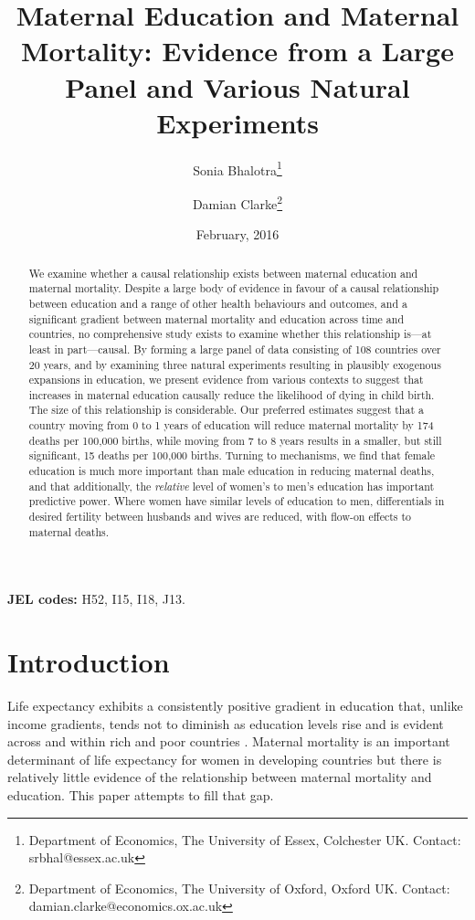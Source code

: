 \documentclass{article}[12pt,subeqn]
\title{Maternal Education and Maternal Mortality: 
Evidence from a Large Panel and Various Natural Experiments}
\author{Sonia Bhalotra\thanks{Department of Economics, The University of Essex,
    Colchester UK. Contact: srbhal@essex.ac.uk}
  \and{Damian Clarke\thanks{Department of Economics, The University of Oxford,
      Oxford UK. Contact: damian.clarke@economics.ox.ac.uk}}}
\date{February, 2016}
\begin{document}
\begin{spacing}{1.4}

\maketitle

\begin{abstract}
We examine whether a causal relationship exists between maternal education and 
maternal mortality. Despite a large body of evidence in favour of a causal 
relationship between education and a range of other health behaviours and 
outcomes, and a significant gradient between maternal mortality and education 
across time and countries, no comprehensive study exists to examine whether this 
relationship is---at least in part---causal.  By forming a large panel of data 
consisting of 108 countries over 20 years, and by examining three natural 
experiments resulting in plausibly exogenous expansions in education, we present 
evidence from various contexts to suggest that increases in maternal education
causally reduce the likelihood of dying in child birth.  The size of this
relationship is considerable.  Our preferred estimates suggest that a country
moving from 0 to 1 years of education will reduce maternal mortality by 174 deaths
per 100,000 births, while moving from 7 to 8 years results in a smaller, but still 
significant, 15 deaths per 100,000 births.  Turning to mechanisms, we find that
female education is much more important than male education in reducing maternal
deaths, and that additionally, the \emph{relative} level of women's to men's
education has important predictive power.  Where women have similar levels of
education to men, differentials in desired fertility between husbands and wives
are reduced, with flow-on effects to maternal deaths.
\end{abstract}
\hspace{8mm} \textbf{JEL codes:} H52, I15, I18, J13.

\newpage
\section{Introduction}
Life expectancy exhibits a consistently positive gradient in education that, 
unlike income gradients, tends not to diminish as education levels rise and is 
evident across and within rich and poor countries \citep{RichardsBarry1998, 
KunstMackenbach1994, EloPreston1996, LlerasMuney2005, Mearaetal2008}. Maternal 
mortality is an important determinant of life expectancy for women in developing 
countries but there is relatively little evidence of the relationship between
maternal mortality and education. This paper attempts to fill that gap.


\end{spacing}
\end{document}
